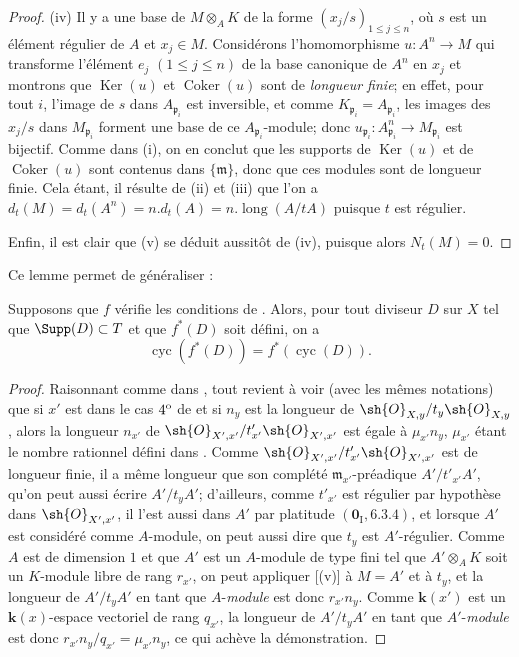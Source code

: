 \begin{proof}
(iv) Il y a une base de $M\otimes_AK$ de la forme $(x_j/s)_{1\leq j\leq n}$, où $s$ est un élément régulier de $A$ et $x_j\in M$.
Considérons l'homomorphisme $u:A^n\to M$ qui transforme l'élément $e_j$ $(1\leq j\leq n)$ de la base canonique de $A^n$ en $x_j$ et montrons que $\operatorname{Ker}(u)$ et $\operatorname{Coker}(u)$ sont de \emph{longueur finie};
en effet, pour tout $i$, l'image de $s$ dans $A_{\mathfrak{p}_i}$ est inversible, et comme $K_{\mathfrak{p}_i}=A_{\mathfrak{p}_i}$, les images des $x_j/s$ dans $M_{\mathfrak{p}_i}$ forment une base de ce $A_{\mathfrak{p}_i}$-module;
donc $u_{\mathfrak{p}_i}:A_{\mathfrak{p}_i}^n\to M_{\mathfrak{p}_i}$ est bijectif.
Comme dans (i), on en conclut que les supports de $\operatorname{Ker}(u)$ et de $\operatorname{Coker}(u)$ sont contenus dans $\{\mathfrak{m}\}$, donc que ces modules sont de longueur finie.
Cela étant, il résulte de (ii) et (iii) que l'on a $d_t(M)=d_t(A^n)=n.d_t(A)=n.\operatorname{long}(A/tA)$ puisque $t$ est régulier.

Enfin, il est clair que (v) se déduit aussitôt de (iv), puisque alors $N_t(M)=0$.
\end{proof}

Ce lemme permet de généraliser :

\begin{proposition}[21.10.13]
\label{IV.21.10.13bis}
Supposons que $f$ vérifie les conditions de .
Alors, pour tout diviseur $D$ sur $X$ tel que $\Supp(D)\subset T$ et que $f^*(D)$ soit défini, on a
\[
\label{IV.21.10.13.1}
  \operatorname{cyc}(f^*(D))=f^*(\operatorname{cyc}(D)).
  \tag{21.10.13.1}
\]
\end{proposition}

\begin{proof}
Raisonnant comme dans , tout revient à voir (avec les mêmes notations) que si $x'$ est dans le cas $4\textsuperscript{o}$ de  et si $n_y$ est la longueur de $\sh{O}_{X,y}/t_y\sh{O}_{X,y}$, alors la
longueur $n_{x'}$ de $\sh{O}_{X',x'}/t'_{x'}\sh{O}_{X',x'}$ est égale à $\mu_{x'}n_y$, $\mu_{x'}$ étant le nombre rationnel défini dans .
Comme $\sh{O}_{X',x'}/t'_{x'}\sh{O}_{X',x'}$ est de longueur finie, il a même longueur que son complété $\mathfrak{m}_{x'}$-préadique $A'/t'_{x'}A'$, qu'on peut aussi écrire $A'/t_yA'$;
d'ailleurs, comme $t'_{x'}$ est régulier par hypothèse dans $\sh{O}_{X',x'}$, il l'est aussi dans $A'$ par platitude $(\mathbf{0}_{\mathrm{I}},6.3.4)$, et lorsque $A'$ est considéré comme $A$-module, on peut aussi dire que $t_y$ est $A'$-régulier.
Comme $A$ est de dimension $1$ et que $A'$ est un $A$-module de type fini tel que $A'\otimes_AK$ soit un $K$-module libre de rang $r_{x'}$, on peut appliquer [(v)] à $M=A'$ et à $t_y$, et la longueur de $A'/t_yA'$ en tant que $A$-\emph{module} est donc $r_{x'}n_y$.
Comme $\boldsymbol{k}(x')$ est un $\boldsymbol{k}(x)$-espace vectoriel de rang $q_{x'}$, la longueur de $A'/t_yA'$ en tant que $A'$-\emph{module} est donc $r_{x'}n_y/q_{x'}=\mu_{x'}n_y$, ce qui achève la démonstration.
\end{proof}

